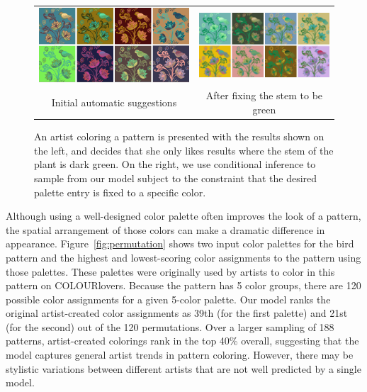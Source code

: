 \begin{figure}[ht]
\begin{tabular}{cc} 
\includegraphics[width=.475\linewidth]{figs/constrainedSearchUnconstrained}&\includegraphics[width=.475\linewidth]{figs/constrainedSearchConstrained}\\
Initial automatic suggestions & After fixing the stem to be green\\
\end{tabular}

\caption{An artist coloring a pattern is presented with the results shown on the left, and decides that she only likes results where the stem of the plant is dark green. On the right, we use conditional inference to sample from our model subject to the constraint that the desired palette entry is fixed to a specific color.}
\label{fig:constrainedInference}
\vspace{-1.0em}
\end{figure}

Although using a well-designed color palette often improves the look of a pattern, the spatial arrangement of those colors can make a dramatic difference in appearance. Figure~\ref{fig:permutation} shows two input color palettes for the bird pattern and the highest and lowest-scoring color assignments to the pattern using those palettes. These palettes were originally used by artists to color in this pattern on COLOURlovers. Because the pattern has 5 color groups, there are 120 possible color assignments for a given 5-color palette. Our model ranks the original artist-created color assignments as 39th (for the first palette) and 21st (for the second) out of the 120 permutations. Over a larger sampling of 188 patterns, artist-created colorings rank in the top 40\% overall, suggesting that the model captures general artist trends in pattern coloring. However, there may be stylistic variations between different artists that are not well predicted by a single model.

